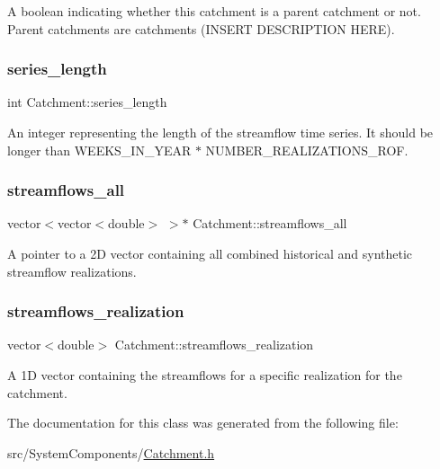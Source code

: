 A boolean indicating whether this catchment is a parent catchment or not. Parent catchments are catchments (I\+N\+S\+E\+RT D\+E\+S\+C\+R\+I\+P\+T\+I\+ON H\+E\+RE). 

\mbox{\label{classCatchment_a2d4994220f63b876348b4ce4892bc6d3}} 
\subsubsection{\texorpdfstring{series\+\_\+length}{series\_length}}
{\footnotesize\ttfamily int Catchment\+::series\+\_\+length\hspace{0.3cm}{\ttfamily [protected]}}



An integer representing the length of the streamflow time series. It should be longer than W\+E\+E\+K\+S\+\_\+\+I\+N\+\_\+\+Y\+E\+AR $\ast$ N\+U\+M\+B\+E\+R\+\_\+\+R\+E\+A\+L\+I\+Z\+A\+T\+I\+O\+N\+S\+\_\+\+R\+OF. 

\mbox{\label{classCatchment_a579ccda86831f286c19c76354e7125c3}} 
\subsubsection{\texorpdfstring{streamflows\+\_\+all}{streamflows\_all}}
{\footnotesize\ttfamily vector$<$vector$<$double$>$ $>$$\ast$ Catchment\+::streamflows\+\_\+all\hspace{0.3cm}{\ttfamily [protected]}}



A pointer to a 2D vector containing all combined historical and synthetic streamflow realizations. 

\mbox{\label{classCatchment_aaf04c295ecd6b666fa1439d3d5bc072a}} 
\subsubsection{\texorpdfstring{streamflows\+\_\+realization}{streamflows\_realization}}
{\footnotesize\ttfamily vector$<$double$>$ Catchment\+::streamflows\+\_\+realization\hspace{0.3cm}{\ttfamily [protected]}}



A 1D vector containing the streamflows for a specific realization for the catchment. 



The documentation for this class was generated from the following file\+:\begin{DoxyCompactItemize}
\item 
src/\+System\+Components/\mbox{\hyperlink{Catchment_8h}{Catchment.\+h}}\end{DoxyCompactItemize}
